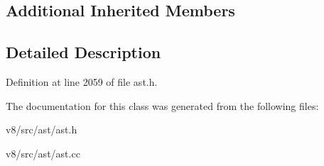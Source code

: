 \subsection*{Additional Inherited Members}


\subsection{Detailed Description}


Definition at line 2059 of file ast.\+h.



The documentation for this class was generated from the following files\+:\begin{DoxyCompactItemize}
\item 
v8/src/ast/ast.\+h\item 
v8/src/ast/ast.\+cc\end{DoxyCompactItemize}
